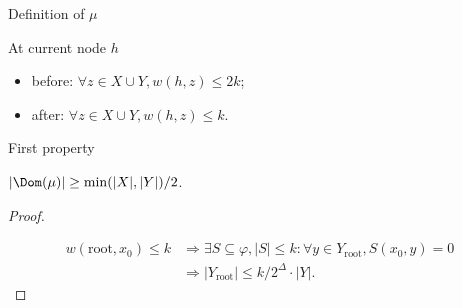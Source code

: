 \begin{frame}{Definition of $\mu$}
    \begin{lemma}
        At current node $h$
        \begin{itemize}
            \item before: $\forall z \in X \cup Y, w(h, z) \le 2k$;
            \item after: $\forall z \in X \cup Y, w(h, z) \le k$.
        \end{itemize}
    \end{lemma}
\end{frame}

\begin{frame}{First property}
    \begin{lemma}
        $|\Dom(\mu)| \ge \min(|X|, |Y|) / 2$.
    \end{lemma}
    \begin{proof}

        \pause
        \begin{center}
            
        \end{center}

        \pause
        \begin{align*}
          w(\mathrm{root}, x_0) \le k & \Rightarrow
                                        \exists S \subseteq \varphi, |S| \le k: \forall y
                                        \in Y_{\mathrm{root}}, S(x_0, y) = 0 \\
                                      & \Rightarrow |Y_{\mathrm{root}}| \le k / 2^{\Delta} \cdot |Y|.
        \end{align*}
    \end{proof}    
\end{frame}

